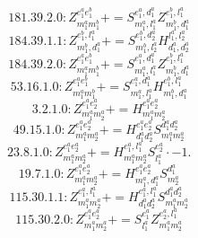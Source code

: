 \documentclass[letterpaper,10pt,fleqn,leqno,onecolumn]{article}
\begin{document}
\begin{equation} \;\;\;\;\;\;  181.39.2.0: Z^{e_{1}^{a}e_{1}^{b}}_{m_{1}^{a}m_{1}^{b}}+=S^{e_{1}^{a},d_{1}^{a}}_{m_{1}^{a},l_{1}^{a}}Z^{e_{1}^{b},l_{1}^{a}}_{m_{1}^{b},d_{1}^{a}} \end{equation}
\begin{equation} \;\;\;\;\;\;  184.39.1.1: Z^{e_{1}^{b},l_{1}^{a}}_{m_{1}^{b},d_{1}^{a}}+=S^{e_{1}^{b},d_{2}^{a}}_{m_{1}^{b},l_{2}^{a}}H^{l_{1}^{a},l_{2}^{a}}_{d_{1}^{a},d_{2}^{a}} \end{equation}
\begin{equation} \;\;\;\;\;\;  184.39.2.0: Z^{e_{1}^{a}e_{1}^{b}}_{m_{1}^{a}m_{1}^{b}}+=S^{e_{1}^{a},d_{1}^{a}}_{m_{1}^{a},l_{1}^{a}}Z^{e_{1}^{b},l_{1}^{a}}_{m_{1}^{b},d_{1}^{a}} \end{equation}
\begin{equation} \;\;\;\;\;\;  53.16.1.0: Z^{e_{1}^{a}e_{1}^{b}}_{m_{1}^{a}m_{1}^{b}}+=S^{e_{1}^{a},d_{1}^{a}}_{m_{1}^{a},l_{1}^{a}}H^{e_{1}^{b},l_{1}^{a}}_{m_{1}^{b},d_{1}^{a}} \end{equation}
\begin{equation} \;\;\;\;\;\;  3.2.1.0: Z^{e_{1}^{a}e_{2}^{a}}_{m_{1}^{a}m_{2}^{a}}+=H^{e_{1}^{a}e_{2}^{a}}_{m_{1}^{a}m_{2}^{a}} \end{equation}
\begin{equation} \;\;\;\;\;\;  49.15.1.0: Z^{e_{1}^{a}e_{2}^{a}}_{m_{1}^{a}m_{2}^{a}}+=H^{e_{1}^{a}e_{2}^{a}}_{d_{1}^{a}d_{2}^{a}}S^{d_{1}^{a}d_{2}^{a}}_{m_{1}^{a}m_{2}^{a}} \end{equation}
\begin{equation} \;\;\;\;\;\;  23.8.1.0: Z^{e_{1}^{a}e_{2}^{a}}_{m_{1}^{a}m_{2}^{a}}+=H^{e_{1}^{a},l_{1}^{a}}_{m_{1}^{a}m_{2}^{a}}S^{e_{2}^{a}}_{l_{1}^{a}}\cdot -1. \end{equation}
\begin{equation} \;\;\;\;\;\;  19.7.1.0: Z^{e_{1}^{a}e_{2}^{a}}_{m_{1}^{a}m_{2}^{a}}+=H^{e_{1}^{a}e_{2}^{a}}_{m_{1}^{a},d_{1}^{a}}S^{d_{1}^{a}}_{m_{2}^{a}} \end{equation}
\begin{equation} \;\;\;\;\;\;  115.30.1.1: Z^{e_{1}^{a},l_{1}^{a}}_{m_{1}^{a}m_{2}^{a}}+=H^{e_{1}^{a},l_{1}^{a}}_{d_{1}^{a}d_{2}^{a}}S^{d_{1}^{a}d_{2}^{a}}_{m_{1}^{a}m_{2}^{a}} \end{equation}
\begin{equation} \;\;\;\;\;\;  115.30.2.0: Z^{e_{1}^{a}e_{2}^{a}}_{m_{1}^{a}m_{2}^{a}}+=S^{e_{1}^{a}}_{l_{1}^{a}}Z^{e_{2}^{a},l_{1}^{a}}_{m_{1}^{a}m_{2}^{a}} \end{equation}
\end{document}
